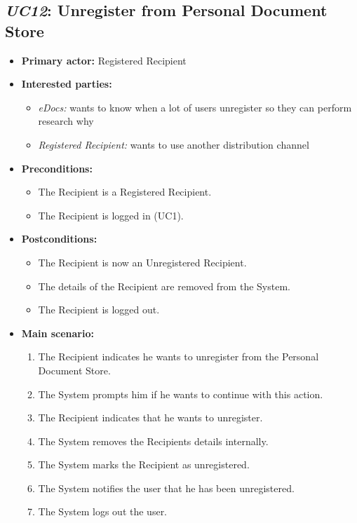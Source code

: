 \documentclass[a4paper,10pt]{article}
\begin{document}
\subsection{\emph{UC12}: Unregister from Personal Document Store}
\begin{itemize}
    \item \textbf{Primary actor:} Registered Recipient
    \item \textbf{Interested parties:} 
        \begin{itemize}
            \item \textit{eDocs:} wants to know when a lot of users unregister so they can perform research why
            \item \textit{Registered Recipient:} wants to use another distribution channel
        \end{itemize}

    \item \textbf{Preconditions:}
        \begin{itemize}
            \item The Recipient is a Registered Recipient.
            \item The Recipient is logged in (UC1).
        \end{itemize}

    \item \textbf{Postconditions:}
        \begin{itemize}
            \item The Recipient is now an Unregistered Recipient.
            \item The details of the Recipient are removed from the System.
            \item The Recipient is logged out.
        \end{itemize}
        
    \item \textbf{Main scenario:} 
    \begin{enumerate}
       \item The Recipient indicates he wants to unregister from the Personal Document Store.
       \item The System prompts him if he wants to continue with this action.
       \item The Recipient indicates that he wants to unregister.
       \item The System removes the Recipients details internally.
       \item The System marks the Recipient as unregistered.
       \item The System notifies the user that he has been unregistered.
       \item The System logs out the user.
    \end{enumerate}


\end{itemize}
\end{document}
